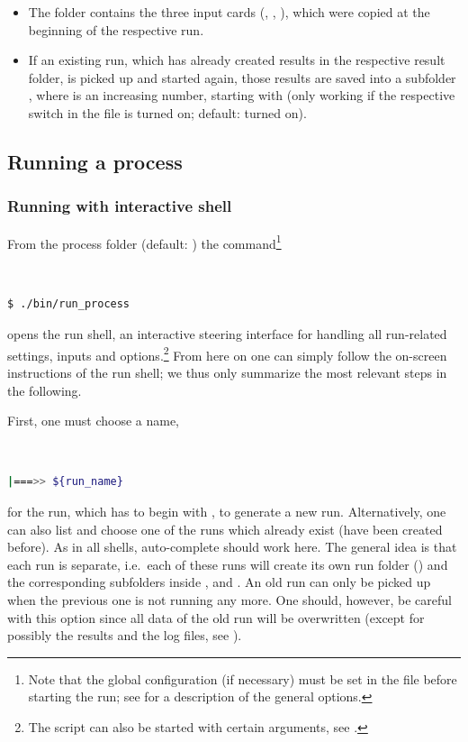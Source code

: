 \documentclass[english,11pt]{article}
\begin{document}
\begin{itemize}
\begin{itemize}[leftmargin=*]
\item The folder  contains the three input cards (, , ), which were copied at the beginning of the respective run.%
\item If an existing run, which has already created results in the respective result folder, 
is picked up and started again, those results are saved into a subfolder , where  is an increasing number, starting with  (only working if the respective switch in the file  is turned on; default: turned on).
\end{itemize}
\end{itemize}



\subsection{Running a process}\label{sec:runprocess}

\subsubsection{Running with interactive shell}
\label{sec:runinteractive}

From the \Matrix{} process folder (default:
) the command\footnote{Note that the global configuration (if necessary) must be set in the  file   before starting the run; 
see  for a description of the general options.}
\lstset{basicstyle=\small}
{\tt
\begin{lstlisting}[language=bash]
 $ ./bin/run_process
\end{lstlisting}
}%
opens the \Matrix{} run shell, an interactive steering interface for handling all run-related 
settings, inputs and options.\footnote{The script can also be started with certain arguments, see .}
From here on one can simply follow the on-screen instructions of the \Matrix{} run shell; we thus only summarize the most 
relevant steps in the following.

First, one must choose a name,
{\tt
\begin{lstlisting}[language=bash]
 |===>> ${run_name}
\end{lstlisting}
}
for the run, which has to begin with , to generate a new run. 
Alternatively, one can also 
list and choose one of the runs which already exist (have been created before). As in all \Matrix{} shells, auto-complete 
should work here. The general idea is that each run is separate, i.e.\
each of these runs will create its own run folder () and the corresponding subfolders inside ,  and . An old run can only be picked up when the previous 
one is not running any more. One should, however, be careful with this option since all data
of the old run will be overwritten (except for possibly the
results and the log files, see ).
\end{document}
